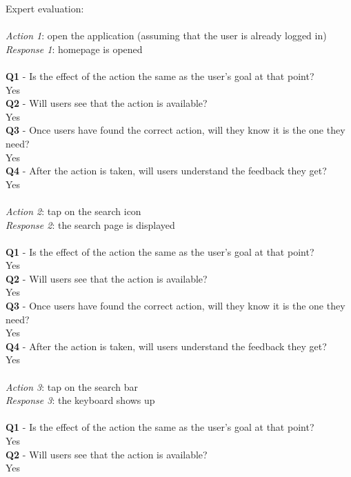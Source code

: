 \documentclass[12pt, a4paper]{article}
\numberwithin{figure}{section}
\newcommand\tab[1][1cm]{\hspace*{#1}}
\begin{document}
\noindent
Expert evaluation:\\\\
\textit{Action 1}: open the application (assuming that the user is already logged in)\\ 
\textit{Response 1}: homepage is opened\\\\
\textbf{Q1} - Is the effect of the action the same as the user’s goal at that point?\\
\tab Yes\\
\textbf{Q2} - Will users see that the action is available?\\
\tab Yes\\
\textbf{Q3} - Once users have found the correct action, will they know it is the one they need?\\
\tab Yes\\
\textbf{Q4} - After the action is taken, will users understand the feedback they get?\\
\tab Yes\\\\
\textit{Action 2}: tap on the search icon\\
\textit{Response 2}: the search page is displayed\\\\
\textbf{Q1} - Is the effect of the action the same as the user’s goal at that point?\\
\tab Yes\\
\textbf{Q2} - Will users see that the action is available?\\
\tab Yes\\
\textbf{Q3} - Once users have found the correct action, will they know it is the one they need?\\
\tab Yes\\
\textbf{Q4} - After the action is taken, will users understand the feedback they get?\\
\tab Yes\\\\
\textit{Action 3}: tap on the search bar\\
\textit{Response 3}: the keyboard shows up\\\\
\textbf{Q1} - Is the effect of the action the same as the user’s goal at that point?\\
\tab Yes\\
\textbf{Q2} - Will users see that the action is available?\\
\tab Yes\\
\end{document}
